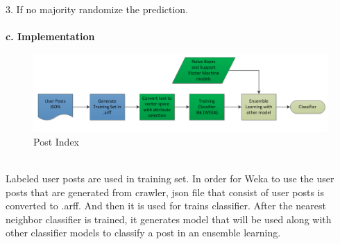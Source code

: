 		   3. If no majority randomize the prediction.\\\\
	\textbf{c. Implementation} \\
	\begin{figure}[h]
		\begin{center}
			\includegraphics[scale=0.55]{images/Nearest.png}
		\caption{Post Index\label{Nearest}}
		\end{center}
	\end{figure}
	\\Labeled user posts are used in training set. In order for Weka to use the user posts that are generated from crawler, json file that consist of user posts is converted to .arff. And then it is used for trains classifier. After the nearest neighbor classifier is trained, it generates model that will be used along with other classifier models to classify a post in an ensemble learning.\
